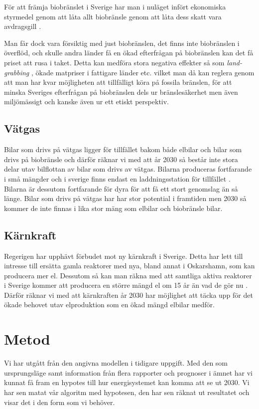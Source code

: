 \documentclass[a4paper,11pt,fleqn, titlepage]{article}
\begin{document}
För att främja biobränslet i Sverige har man i nuläget infört ekonomiska styrmedel 
genom att låta allt biobränsle genom att låta dess skatt vara
avdragsgill \cite{ekonomiskastyrmedel}.

Man får dock vara försiktig med just biobränslen, det finns inte
biobränslen i överflöd, och skulle andra länder få en ökad efterfrågan på
biobränslen kan det få priset att rusa i taket. Detta kan medföra stora
negativa effekter så som \emph{land-grabbing} \cite{bioenergi}, ökade matpriser i
fattigare länder etc. vilket man då kan reglera genom att man har kvar
möjligheten att tillfälligt köra på fossila bränslen, för att minska
Sveriges efterfrågan på biobränslen dels ur bränslesäkerhet men även
miljömässigt och kanske även ur ett etiskt perspektiv.

\subsection{Vätgas}
Bilar som drivs på vätgas ligger för tillfället bakom både elbilar och
bilar som drivs på biobränsle och därför räknar vi med att år 2030 så
består inte stora delar utav bilflottan av bilar som drivs av vätgas.
Bilarna produceras fortfarande i små mängder och i sverige finns endast en
laddningsstation för tillfället \cite{macken}.
Bilarna är dessutom fortfarande för dyra för att få ett stort genomslag än så länge. Bilar som drivs på vätgas har har stor potential i framtiden men 2030 så kommer de inte finnas i lika stor mäng som elbilar och biobränsle bilar.

\subsection{Kärnkraft}
Regerigen har upphävt förbudet mot ny kärnkraft i Sverige. Detta har lett till intresse till ersätta gamla reaktorer med nya, bland annat i Oskarshamn, som kan producera mer el.
Dessutom så kan man räkna med att samtliga aktiva reaktorer i Sverige
kommer att producera en större mängd el om 15 år än vad de gör nu
\cite[s.~80]{karnkraft}. Därför räknar vi med att kärnkraften år 2030 har möjlighet att täcka upp för det ökade behovet utav elproduktion som en ökad mängd elbilar medför.

\section{Metod}
Vi har utgått från den angivna modellen i tidigare uppgift. Med den som
ursprungsläge samt information från flera rapporter och prognoser i ämnet
har vi kunnat få fram en hypotes till hur energisystemet kan komma att se
ut 2030. Vi har sen matat vår algoritm med hypotesen, den har sen räknat ut
resultatet och visar det i den form som vi behöver.
\end{document}
